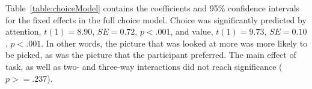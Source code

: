 \documentclass[12pt]{article}
\begin{document}


Table~\ref{table:choiceModel} contains the coefficients and 95\% confidence intervals for the fixed effects in the full choice model. Choice was significantly predicted by attention, $t(1)=8.90$, $SE=0.72$, $p<.001$, and value, $t(1)=9.73$, $SE=0.10$, $p<.001$. In other words, the picture that was looked at more was more likely to be picked, as was the picture that the participant preferred. The main effect of task, as well as two- and three-way interactions did not reach significance ($p>=.237$).



\clearpage
\newpage


\end{document}
